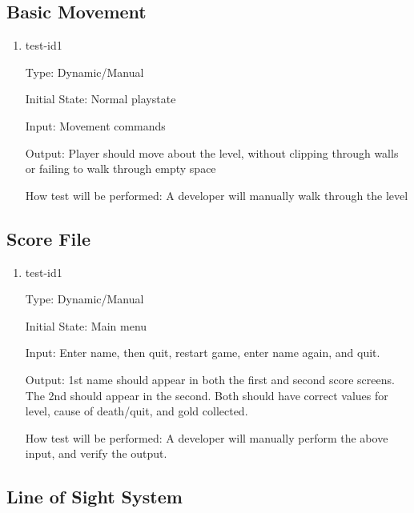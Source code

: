 \documentclass[12pt, titlepage]{article}
\begin{document}
	\subsection{Basic Movement}
		
		\begin{enumerate}

		\item{test-id1\\}

		Type: Dynamic/Manual

		Initial State: Normal playstate

		Input: Movement commands

		Output: Player should move about the level, without clipping through walls or failing to walk through empty space

		How test will be performed: A developer will manually walk through the level

		\end{enumerate}		

	\subsection{Score File}

		\begin{enumerate}

		\item{test-id1\\}

		Type: Dynamic/Manual

		Initial State: Main menu

		Input: Enter name, then quit, restart game, enter name again, and quit.

		Output: 1st name should appear in both the first and second score screens. The 2nd should appear in the second. Both should have correct values for level, cause of death/quit, and gold collected.

		How test will be performed: A developer will manually perform the above input, and verify the output.

		\end{enumerate}

	\subsection{Line of Sight System}
\end{document}
